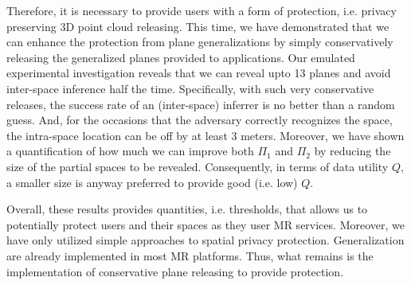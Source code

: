 Therefore, it is necessary to provide users with a form of protection, i.e. privacy preserving 3D point cloud releasing. %
This time, we have demonstrated that we can enhance the protection from plane generalizations by simply conservatively releasing the generalized planes provided to applications. Our emulated experimental investigation reveals that we can reveal upto 13 planes and avoid inter-space inference half the time. Specifically, with such very conservative releases, the success rate of an (inter-space) inferrer is no better than a random guess. And, for the occasions that the adversary correctly recognizes the space, the intra-space location can be off by at least 3 meters. Moreover, we have shown a quantification of how much we can improve both $\Pi_1$ and $\Pi_2$ by reducing the size of the partial spaces to be revealed. Consequently, in terms of data utility $Q$, a smaller size is anyway preferred to provide good (i.e. low) $Q$. %

Overall, these results provides quantities, i.e. thresholds, that allows us to potentially protect users and their spaces as they user MR services. Moreover, we have only utilized simple approaches to spatial privacy protection. Generalization are already implemented in most MR platforms. Thus, what remains is the implementation of conservative plane releasing to provide protection.
